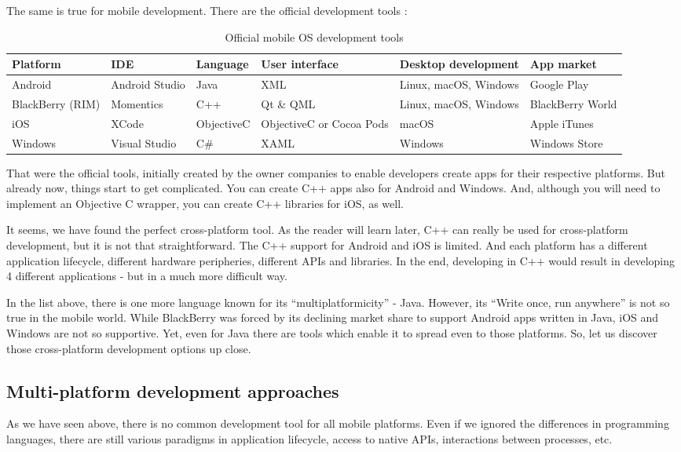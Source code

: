 \documentclass[english,master,public,dept460,male,cpdeclaration,oneside]{diploma}
\begin{document}
The same is true for mobile development. There are the official development tools \cite{taxonomyCP}:
\begin{table}
	\centering
	\caption{Official mobile OS development tools}
	\begin{tabular}{l l l l l l}
		\toprule
		Platform & IDE & Language & User interface & Desktop development & App market\\
		\midrule
		Android & Android Studio & Java & XML & Linux, macOS, Windows & Google Play\\
		BlackBerry (RIM) & Momentics & C++ & Qt \& QML & Linux, macOS, Windows & BlackBerry World \\
		iOS & XCode & ObjectiveC & ObjectiveC or Cocoa Pods & macOS & Apple iTunes \\
		Windows & Visual Studio & C\# & XAML & Windows & Windows Store \\
		\midrule
	\end{tabular}
\end{table}

That were the official tools, initially created by the owner companies to enable developers create apps for their respective platforms. But already now, things start to get complicated. You can create C++ apps also for Android and Windows. And, although you will need to implement an Objective C wrapper, you can create C++ libraries for iOS, as well.

It seems, we have found the perfect cross-platform tool. As the reader will learn later, C++ can really be used for cross-platform development, but it is not that straightforward. The C++ support for Android and iOS is limited. And each platform has a different application lifecycle, different hardware peripheries, different APIs and libraries. In the end, developing in C++ would result in developing 4 different applications - but in a much more difficult way.

In the list above, there is one more language known for its “multiplatformicity” - Java. However, its “Write once, run anywhere” is not so true in the mobile world. While BlackBerry was forced by its declining market share to support Android apps written in Java, iOS and Windows are not so supportive. Yet, even for Java there are tools which enable it to spread even to those platforms. So, let us discover those cross-platform development options up close.

\subsection{Multi-platform development approaches}
As we have seen above, there is no common development tool for all mobile platforms. Even if we ignored the differences in programming languages, there are still various paradigms in application lifecycle, access to native APIs, interactions between processes, etc.
\end{document}
